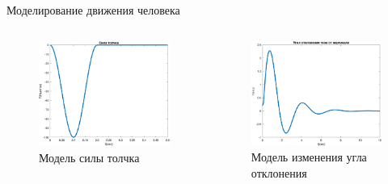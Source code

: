 \documentclass[10pt]{beamer}
\begin{document}
\begin{frame}{Моделирование движения человека}
	\begin{columns}
		\begin{figure}[h!]
			\includegraphics[width=1\linewidth]{images/pushes_my_1.png}
			\caption{Модель силы толчка}
		\end{figure}
		\begin{figure}[h!]
			\includegraphics[width=1\linewidth]{images/deg_my_1.png}
			\caption{Модель изменения угла отклонения}
		\end{figure}
	\end{columns}
\end{frame}
\end{document}
